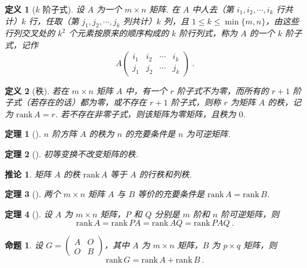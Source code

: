 \documentclass[zihao=-4,UTF8,linespread=1.8,nothm]{aytony_base}
\newtheorem{theorem}{\indent 定理}[subsection]
\newtheorem{proposition}{\indent 命题}[subsection]
\newtheorem*{corollary}{\indent 推论}
\newtheorem{definition}{\indent 定义}[subsection]
\begin{document}
\begin{definition}[$k$ 阶子式]
    设 $A$ 为一个 $m \times n$ 矩阵. 在 $A$ 中人去（第 $i_1, i_2, \cdots, i_k$ 行共计）$k$ 行，任取（第 $j_1, j_2, \cdots, j_k$ 列共计）$k$ 列，且 $1 \leqslant k \leqslant \min \{m, n\}$，由这些行列交叉处的 $k^2$ 个元素按原来的顺序构成的 $k$ 阶行列式，称为 $A$ 的一个 $k$ 阶子式，记作 $$
        A \left(
        \begin{matrix}
                i_1 & i_2 & \cdots & i_k \\
                j_1 & j_2 & \cdots & j_k
            \end{matrix}
        \right)\ .
    $$
\end{definition}

\begin{definition}[秩]
    若在 $m \times n$ 矩阵 $A$ 中，有一个 $r$ 阶子式不为零，而所有的 $r+1$ 阶子式（若存在的话）都为零，或不存在 $r+1$ 阶子式，则称 $r$ 为矩阵 $A$ 的秩，记为 $\mathrm{rank}\,A = r$. 若不存在非零子式，则该矩阵为零矩阵，且秩为 $0$.
\end{definition}

\begin{theorem}[]
    $n$ 阶方阵 $A$ 的秩为 $n$ 的充要条件是 $n$ 为可逆矩阵.
\end{theorem}

\begin{theorem}[]
    初等变换不改变矩阵的秩.
\end{theorem}

\begin{corollary}
    矩阵 $A$ 的秩 $\mathrm{rank}\,A$ 等于 $A$ 的行秩和列秩.
\end{corollary}

\begin{theorem}[]
    两个 $m \times n$ 矩阵 $A$ 与 $B$ 等价的充要条件是 $\mathrm{rank}\,A = \mathrm{rank}\,B$.
\end{theorem}

\begin{theorem}[]
    设 $A$ 为 $m \times n$ 矩阵，$P$ 和 $Q$ 分别是 $m$ 阶和 $n$ 阶可逆矩阵，则 $$
        \mathrm{rank}\,A = \mathrm{rank}\,PA = \mathrm{rank}\,AQ = \mathrm{rank}\,PAQ\ .
    $$
\end{theorem}

\begin{proposition}
    设 $G = \left(
        \begin{matrix}
                A & O \\
                O & B
            \end{matrix}
        \right)$，其中 $A$ 为 $m \times n$ 矩阵，$B$ 为 $p \times q$ 矩阵，则 $$
        \mathrm{rank}\,G = \mathrm{rank}\,A + \mathrm{rank}\,B\ .
    $$
\end{proposition}
\end{document}
